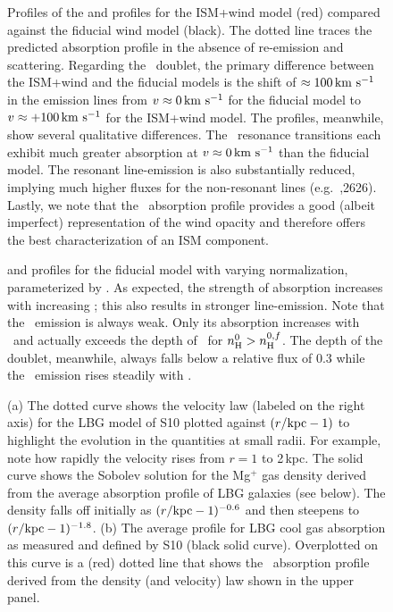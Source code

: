 \documentclass[12pt,preprint]{aastex}
\begin{document}
\begin{figure}
\caption{
Profiles of the  and  profiles for the ISM+wind
model (red) compared against the fiducial wind model (black). 
The dotted line traces the predicted absorption profile in the absence
of re-emission and scattering.
Regarding the ~doublet, the primary difference between the
ISM+wind and the fiducial models is the shift of $\approx 100 \, {\rm km~s^{-1}}$
in the emission lines from $v \approx 0 \, {\rm km~s^{-1}}$ for the fiducial
model to $v \approx +100\, {\rm km~s^{-1}}$ for the ISM+wind model. 
The  profiles, meanwhile, show several qualitative differences. 
The \feiid\ resonance transitions each exhibit much
greater absorption at $v \approx 0 \, {\rm km~s^{-1}}$ than the fiducial model.
The resonant line-emission is also substantially
reduced, implying much higher fluxes for the non-resonant lines (e.g.\
\feiic,2626).  
Lastly, we note that the \feiia\ absorption profile provides a good
(albeit imperfect) representation of the wind opacity and therefore
offers the best characterization of an ISM component.
}
\label{fig:ISM_spec}
\end{figure}

\begin{figure}
\caption{
 and  profiles for the fiducial model with
varying normalization, parameterized by \nhn.  As expected, the
strength of absorption increases with increasing \nhn; this also
results in stronger line-emission.  Note that the \feiia\ emission is
always weak. Only its absorption increases with \nhn\ and actually exceeds
the depth of \feiib\ for $n_{\rm H}^0 > n_{\rm H}^{0,f}$.  The depth of the
 doublet, meanwhile, always falls below a relative flux of
0.3 while the \mgiib\ emission rises steadily with \nhn.
}
\label{fig:norm}
\end{figure}

\begin{figure}
\caption{
(a) The dotted curve shows the velocity law (labeled on the
right axis) for the LBG model
of S10 plotted against $(r/{\rm kpc} -1)$ to highlight the evolution
in the quantities at small radii.  For example,  note how rapidly the velocity rises from $r =
1$ to 2\,kpc.  The solid curve shows the Sobolev solution for the
Mg$^+$ gas
density derived from 
the average absorption profile of LBG galaxies (see below).
The density falls off initially as $(r/{\rm kpc}-1)^{-0.6}$ and then
steepens to $(r/{\rm kpc}-1)^{-1.8}$.
(b) The average profile for LBG cool gas absorption as
measured and defined by S10
(black solid curve).  Overplotted on this curve is a (red) dotted line that
shows the \mgiia\ absorption profile derived from the density (and velocity)
law shown in the upper panel.  
}
\label{fig:LBG_Sobolev}
\end{figure}
\end{document}
